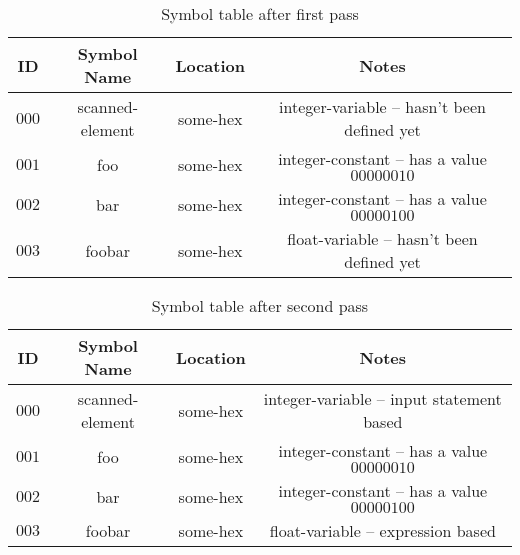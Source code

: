 \documentclass[18pt]{article}
\begin{document}
\begin{table}

\centering

\begin{tabular}{|c|c|c|c|}

\hline

ID & Symbol Name & Location & Notes \\
\hline

$000$ & scanned-element & some-hex & integer-variable -- hasn't been defined yet\\
\hline

$001$ & foo & some-hex & integer-constant -- has a value $00000010$ \\
\hline

$002$ & bar & some-hex & integer-constant -- has a value $00000100$ \\
\hline

$003$ & foobar & some-hex & float-variable -- hasn't been defined yet\\
\hline
\end{tabular}
\caption{Symbol table after first pass}
\end{table}



\begin{table}

\centering

\begin{tabular}{|c|c|c|c|}

\hline

ID & Symbol Name & Location & Notes \\
\hline

$000$ & scanned-element & some-hex & integer-variable -- input statement based\\
\hline

$001$ & foo & some-hex & integer-constant -- has a value $00000010$ \\
\hline

$002$ & bar & some-hex & integer-constant -- has a value $00000100$ \\
\hline

$003$ & foobar & some-hex & float-variable -- expression based \\
\hline
\end{tabular}

\caption{Symbol table after second pass}
\end{table}
\end{document}
